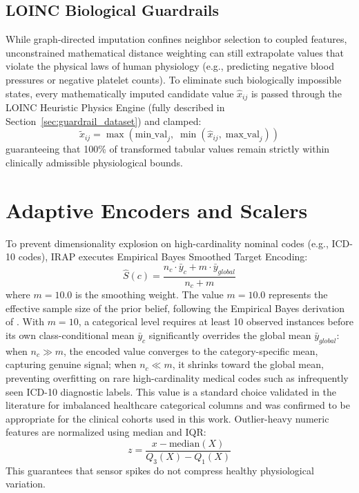 \documentclass[MTech]{ugthesis}
\begin{document}
\subsection{LOINC Biological Guardrails}
While graph-directed imputation confines neighbor selection to coupled features, unconstrained mathematical distance weighting can still extrapolate values that violate the physical laws of human physiology (e.g., predicting negative blood pressures or negative platelet counts). To eliminate such biologically impossible states, every mathematically imputed candidate value $\hat{x}_{ij}$ is passed through the LOINC Heuristic Physics Engine (fully described in Section~\ref{sec:guardrail_dataset}) and clamped:
\begin{equation}
    \tilde{x}_{ij} = \max\left(\text{min\_val}_j, \; \min\left(\hat{x}_{ij}, \; \text{max\_val}_j\right)\right)
\end{equation}
guaranteeing that 100\% of transformed tabular values remain strictly within clinically admissible physiological bounds.

\section{Adaptive Encoders and Scalers}
To prevent dimensionality explosion on high-cardinality nominal codes (e.g., ICD-10 codes), IRAP executes Empirical Bayes Smoothed Target Encoding:
\begin{equation}
    \hat{S}(c) = \frac{n_c \cdot \bar{y}_c + m \cdot \bar{y}_{global}}{n_c + m}
\end{equation}
where $m = 10.0$ is the smoothing weight. The value $m = 10.0$ represents the effective sample size of the prior belief, following the Empirical Bayes derivation of \citet{micci2001preprocessing}. With $m = 10$, a categorical level requires at least 10 observed instances before its own class-conditional mean $\bar{y}_c$ significantly overrides the global mean $\bar{y}_{global}$: when $n_c \gg m$, the encoded value converges to the category-specific mean, capturing genuine signal; when $n_c \ll m$, it shrinks toward the global mean, preventing overfitting on rare high-cardinality medical codes such as infrequently seen ICD-10 diagnostic labels. This value is a standard choice validated in the literature for imbalanced healthcare categorical columns and was confirmed to be appropriate for the clinical cohorts used in this work. Outlier-heavy numeric features are normalized using median and \ac{IQR}:
\begin{equation}
    z = \frac{x - \text{median}(X)}{Q_3(X) - Q_1(X)}
\end{equation}
This guarantees that sensor spikes do not compress healthy physiological variation.
\end{document}
